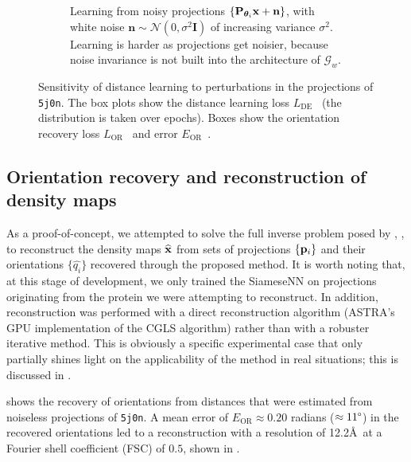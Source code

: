 \begin{figure}[ht!]
\begin{subfigure}[t]{0.47\linewidth}
        \caption{%
            Learning from noisy projections $\{ \mathbf{P}_{{\boldsymbol{\theta}}_i} \mathbf{x} + \mathbf{n} \}$, with white noise $\mathbf{n} \sim \mathcal{N}(0, \sigma^2\mathbf{I})$ of increasing variance $\sigma^2$.
            Learning is harder as projections get noisier, because noise invariance is not built into the architecture of $\mathcal{G}_w$.
        }\label{fig:results:distance-estimation:noise}
    \end{subfigure}
    \caption{%
        Sensitivity of distance learning to perturbations in the projections of \texttt{5j0n}.
        The box plots show the distance learning loss $L_\text{DE}$~ (the distribution is taken over epochs).
        Boxes show the orientation recovery loss $L_\text{OR}$~ and error $E_\text{OR}$~.
    }\label{fig:results:distance-estimation}
\end{figure}


\subsection{Orientation recovery and reconstruction of density maps}\label{sec:results:orientation-recovery:reconstruction}

As a proof-of-concept, we attempted to solve the full inverse problem posed by , \ie, to reconstruct the density maps $\widehat{\mathbf{x}}$ from sets of projections $\{ \mathbf{p}_i \}$ and their orientations $\{ \widehat{q_i} \}$ recovered through the proposed method.
It is worth noting that, at this stage of development, we only trained the SiameseNN on projections originating from the protein we were attempting to reconstruct.
In addition, reconstruction was performed with a direct reconstruction algorithm (ASTRA's GPU implementation of the CGLS algorithm) rather than with a robuster iterative method.
This is obviously a specific experimental case that only partially shines light on the applicability of the method in real situations; this is discussed in .

 shows the recovery of orientations from distances that were estimated from noiseless projections of \texttt{5j0n}.
A mean error of $E_\text{OR} \approx 0.20$ radians ($\approx 11\degree$) in the recovered orientations led to a reconstruction with a resolution of 12.2\AA\ at a Fourier shell coefficient (FSC) of $0.5$, shown in .

